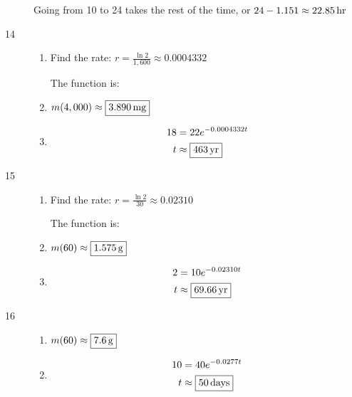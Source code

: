\documentclass{exam}
\begin{document}
\begin{description}
        Going from 10 to 24 takes the rest of the time, or $24 - 1.151 \approx \unit[22.85]{hr} $

      \item[14] 
        \begin{enumerate}[a]
          \item Find the rate: $r = \frac{\ln 2}{1,600} \approx 0.0004332$

            The function is: 

          \item $m(4,000) \approx \boxed{\unit[3.890]{mg}}$

          \item
            \begin{align*}
              18 & = 22 e^{-0.0004332 t} \\
              t  & \approx \boxed{\unit[463]{yr}} \\
            \end{align*}

        \end{enumerate}

      \item[15] 
        \begin{enumerate}[a]
          \item Find the rate: $r = \frac{\ln 2}{30} \approx 0.02310$

            The function is: 

          \item $m(60) \approx \boxed{\unit[1.575]{g}}$

          \item
            \begin{align*}
              2 & = 10 e^{-0.02310 t} \\
              t  & \approx \boxed{\unit[69.66]{yr}} \\
            \end{align*}

        \end{enumerate}

      \item[16] 
        \begin{enumerate}[a]
          \item $m(60) \approx \boxed{\unit[7.6]{g}}$

          \item
            \begin{align*}
              10 & = 40 e^{-0.0277t} \\
              t  & \approx \boxed{\unit[50]{days}} \\
            \end{align*}


\end{enumerate}
\end{description}
\end{document}
